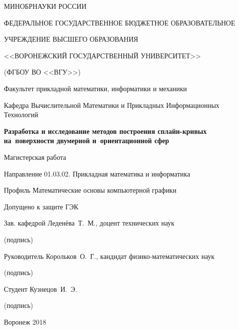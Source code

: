 \thispagestyle{empty}

\begin{center}
{\small
МИНОБРНАУКИ РОССИИ\par
ФЕДЕРАЛЬНОЕ ГОСУДАРСТВЕННОЕ БЮДЖЕТНОЕ ОБРАЗОВАТЕЛЬНОЕ\par
УЧРЕЖДЕНИЕ ВЫСШЕГО ОБРАЗОВАНИЯ\par
<<ВОРОНЕЖСКИЙ ГОСУДАРСТВЕННЫЙ УНИВЕРСИТЕТ>>\par
(ФГБОУ ВО <<ВГУ>>)\par
\vspace{4mm}}

Факультет прикладной математики, информатики и механики\par
\vspace{5mm}
Кафедра Вычислительной Математики и Прикладных Информационных Технологий\par
\vspace{35mm}

\textbf{Разработка и исследование методов построения сплайн-кривых на~поверхности двумерной и~ориентационной сфер}\par
\vspace{8mm}

Магистерская работа\par
Направление 01.03.02. Прикладная математика и информатика\par
Профиль Математические основы компьютерной графики\par
\end{center}
\vspace{35mm}

{\small
Допущено к защите ГЭК \underline{\qquad\qquad\qquad}\par
\vspace{8mm}
Зав. кафедрой \underline{\qquad\qquad\qquad} Леденёва~Т.~М., доцент технических наук\par
\qquad\qquad\qquad\qquad(подпись)\par
\vspace{2mm}
Руководитель \underline{\qquad\qquad\qquad} Корольков~О.~Г., кандидат физико-математических наук\par
\qquad\qquad\qquad\qquad(подпись)\par
\vspace{2mm}
Студент \qquad \underline{\qquad\qquad\qquad} Кузнецов~И.~Э.\par
\qquad\qquad\qquad\qquad(подпись)\par
\vspace{11mm}
}

\begin{center}
Воронеж 2018
\end{center}
